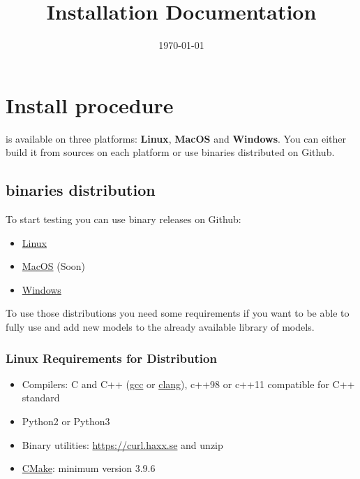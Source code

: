 \documentclass[a4paper, 12pt]{report}
\begin{document}
\title{\Dynawo Installation Documentation}
\date\today

\maketitle
\tableofcontents

\chapter{Install procedure}

\Dynawo is available on three platforms: \textbf{Linux}, \textbf{MacOS} and \textbf{Windows}. You can either build it from sources on each platform or use binaries distributed on Github.

\section{\Dynawo binaries distribution}

To start testing \Dynawo you can use binary releases on Github:
\begin{itemize}
\item
  \href{https://github.com/dynawo/dynawo/releases/download/v1.2.2/Dynawo_Linux_v1.2.2.zip}{Linux}
\item
  \href{#}{MacOS} (Soon)
\item
  \href{https://github.com/dynawo/dynawo/releases/download/v1.2.2/Dynawo_Windows_v1.2.2.zip}{Windows}
\end{itemize}

To use those distributions you need some requirements if you want to be able to fully use \Dynawo and add new models to the already available library of models.

\subsection{Linux Requirements for Distribution}

\begin{itemize}
\item Compilers: C and C++ (\href{https://www.gnu.org/software/gcc}{gcc} or \href{https://clang.llvm.org}{clang}), c++98 or c++11 compatible for C++ standard
\item Python2 or Python3
\item Binary utilities: \href{curl}{https://curl.haxx.se} and unzip
\item \href{https://cmake.org/}{CMake}: minimum version 3.9.6
\end{itemize}
\end{document}
